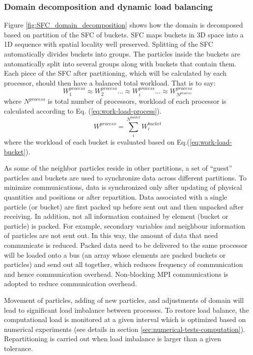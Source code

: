 \subsubsection{Domain decomposition and dynamic load balancing}
Figure \ref{fig:SFC_domain_decomposition} shows how the domain is decomposed based on partition of the SFC of buckets. SFC maps buckets in 3D space into a 1D sequence with spatial locality well preserved. Splitting of the SFC automatically divides buckets into groups. The particles inside the buckets are automatically split into several groups along with buckets that contain them. Each piece of the SFC after partitioning, which will be calculated by each processor, should then have a balanced total workload. That is to say:
\begin{equation}
W^{process}_1 \approx W^{process}_2 ... \approx W^{process}_i ...\approx W^{process}_{N^{process}}
\label{eq:work-load-balance}
\end{equation}
where $N^{process}$ is total number of processors, workload of each processor is calculated according to Eq. (\ref{eq:work-load-process}).
\begin{equation}
W^{process} = \sum_i^{N^{bucket}} W_i^{bucket}
\label{eq:work-load-process}
\end{equation}
where the workload of each bucket is evaluated based on Eq.(\ref{eq:work-load-bucket}).

As some of the neighbor particles reside in other partitions, a set of ``guest'' particles and buckets are used to synchronize data across different partitions. To minimize communications, data is synchronized only after updating of physical quantities and positions or after repartition. Data associated with a single particle (or bucket) are first packed up before sent out and then unpacked after receiving. In addition, not all information contained by element (bucket or particle) is packed. For example, secondary variables and neighbour information of particles are not sent out. In this way, the amount of data that need communicate is reduced. Packed data need to be delivered to the same processor will be loaded onto a bus (an array whose elements are packed buckets or particles) and send out all together, which reduces frequency of communication and hence communication overhead. Non-blocking MPI communications is adopted to reduce communication overhead.

Movement of particles, adding of new particles, and adjustments of domain will lead to significant load imbalance between processes. To restore load balance, the computational load is monitored at a given interval which is optimized based on numerical experiments (see details in section \ref{sec:numerical-tests-computation}). Repartitioning is carried out when load imbalance is larger than a given tolerance.

